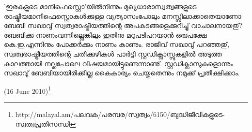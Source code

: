 'ഇരകളുടെ മാനിഫെസ്റ്റൊ'യില്‍നിന്നും മുഖ്യധാരാസ്വത്വങ്ങളുടെ രാഷ്ട്രീയമാനിഫെസ്റ്റൊകള്‍ക്കുള്ള വ്യത്യാസംപോലും 
മനസ്സിലാക്കാതെയാണോ ബേബി സഖാവു് സ്വത്വരാഷ്ട്രീയത്തിന്റെ അപകടങ്ങളെക്കുറിച്ചു് വാചാലനായതു്? ബേബിക്കു 
നാണംവന്നില്ലെങ്കിലും ഇതിനു മറുപടിപറയാന്‍ ഒരുപക്ഷേ കെ.ഇ.എന്നിനും പോക്കര്‍ക്കും നാണം കാണും. 
രാജീവ് സഖാവു് പറഞ്ഞതു്, സ്വത്വരാഷ്ട്രീയത്തിന്റെ ചതിക്കുഴികള്‍ പാര്‍ട്ടി സ്റ്റഡിക്ലാസ്സുകളില്‍ അടുത്ത 
കാലത്തായി നല്ലപോലെ വിഷയമായിട്ടുണ്ടെന്നാണു്. സ്റ്റഡിക്ലാസുകളൊന്നും സഖാവു് ബേബിയായിരിക്കില്ല കൈകാര്യം 
ചെയ്തതെന്നും നമുക്ക് പ്രതീക്ഷിക്കാം.

(16 June 2010)\footnote{http://malayal.am/പലവക/പരമ്പര/സ്വത്വം/6150/ബുദ്ധിജീവികളുടെ-സ്വത്വപ്രതിസന്ധി}

\newpage
